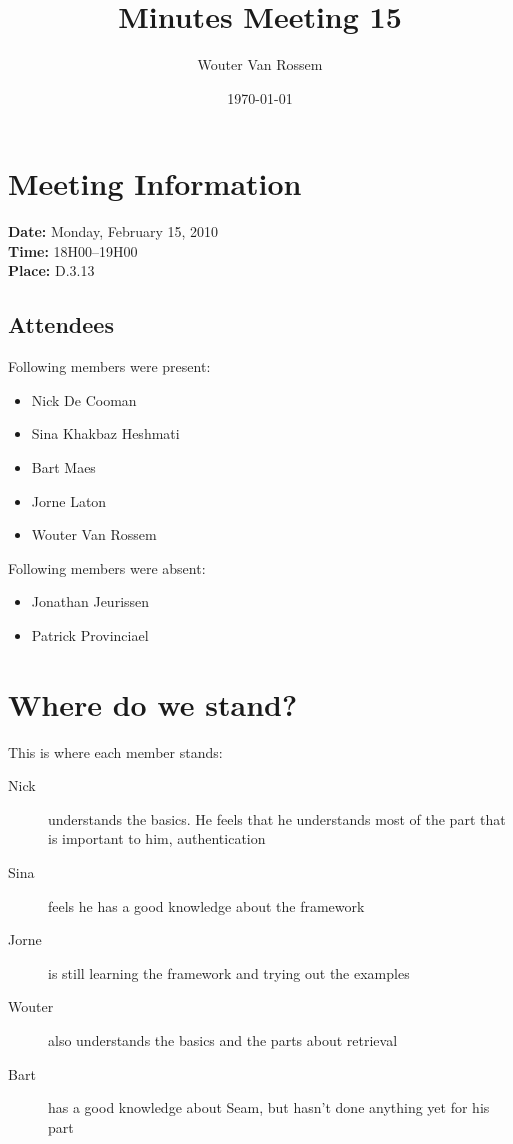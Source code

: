 \documentclass[a4paper, 12pt]{article}
\begin{document}
\title{Minutes Meeting 15}
\author{Wouter Van Rossem}
\date{\today}

\maketitle	
	\section{Meeting Information}
		\textbf{Date:} Monday, February 15, 2010\\
		\textbf{Time:} 18H00--19H00\\
		\textbf{Place:} D.3.13\\
		\subsection{Attendees}
Following members were present:
			\begin{itemize}
				\item Nick De Cooman
				\item Sina Khakbaz Heshmati
				\item Bart Maes
				\item Jorne Laton		
				\item Wouter Van Rossem
			\end{itemize}
Following members were absent:
			\begin{itemize}
			 	\item Jonathan Jeurissen
			 	\item Patrick Provinciael
			\end{itemize}
			
\section{Where do we stand?}
	This is where each member stands:
	\begin{description}
		\item[Nick] understands the basics. He feels that he understands most of the part that is important to him, authentication
		\item[Sina] feels he has a good knowledge about the framework
		\item[Jorne] is still learning the framework and trying out the examples
		\item[Wouter] also understands the basics and the parts about retrieval
		\item[Bart] has a good knowledge about Seam, but hasn't done anything yet for his part
	\end{description}
\end{document}
